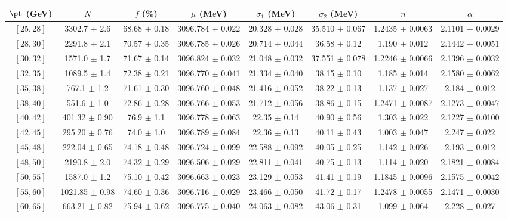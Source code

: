 \begin{tabular}{c||c|c|c|c|c|c|c}
$\pt$ (GeV) & $N$ & $f$ (\%) & $\mu$ (MeV) & $\sigma_1$ (MeV) & $\sigma_2$ (MeV) & $n$ & $\alpha$ \\
\hline
$[25, 28]$ & 3302.7 $\pm$ 2.6 & 68.68 $\pm$ 0.18 & 3096.784 $\pm$ 0.022 & 20.328 $\pm$ 0.028 & 35.510 $\pm$ 0.067 & 1.2435 $\pm$ 0.0063 & 2.1101 $\pm$ 0.0029\\
$[28, 30]$ & 2291.8 $\pm$ 2.1 & 70.57 $\pm$ 0.35 & 3096.785 $\pm$ 0.026 & 20.714 $\pm$ 0.044 & 36.58 $\pm$ 0.12 & 1.190 $\pm$ 0.012 & 2.1442 $\pm$ 0.0051\\
$[30, 32]$ & 1571.0 $\pm$ 1.7 & 71.67 $\pm$ 0.14 & 3096.824 $\pm$ 0.032 & 21.048 $\pm$ 0.032 & 37.551 $\pm$ 0.078 & 1.2246 $\pm$ 0.0066 & 2.1396 $\pm$ 0.0032\\
$[32, 35]$ & 1089.5 $\pm$ 1.4 & 72.38 $\pm$ 0.21 & 3096.770 $\pm$ 0.041 & 21.334 $\pm$ 0.040 & 38.15 $\pm$ 0.10 & 1.185 $\pm$ 0.014 & 2.1580 $\pm$ 0.0062\\
$[35, 38]$ & 767.1 $\pm$ 1.2 & 71.61 $\pm$ 0.30 & 3096.760 $\pm$ 0.048 & 21.416 $\pm$ 0.052 & 38.22 $\pm$ 0.13 & 1.137 $\pm$ 0.027 & 2.184 $\pm$ 0.012\\
$[38, 40]$ & 551.6 $\pm$ 1.0 & 72.86 $\pm$ 0.28 & 3096.766 $\pm$ 0.053 & 21.712 $\pm$ 0.056 & 38.86 $\pm$ 0.15 & 1.2471 $\pm$ 0.0087 & 2.1273 $\pm$ 0.0047\\
$[40, 42]$ & 401.32 $\pm$ 0.90 & 76.9 $\pm$ 1.1 & 3096.778 $\pm$ 0.063 & 22.35 $\pm$ 0.14 & 40.90 $\pm$ 0.56 & 1.303 $\pm$ 0.022 & 2.1227 $\pm$ 0.0100\\
$[42, 45]$ & 295.20 $\pm$ 0.76 & 74.0 $\pm$ 1.0 & 3096.789 $\pm$ 0.084 & 22.36 $\pm$ 0.13 & 40.11 $\pm$ 0.43 & 1.003 $\pm$ 0.047 & 2.247 $\pm$ 0.022\\
$[45, 48]$ & 222.04 $\pm$ 0.65 & 74.18 $\pm$ 0.48 & 3096.724 $\pm$ 0.099 & 22.588 $\pm$ 0.092 & 40.05 $\pm$ 0.25 & 1.142 $\pm$ 0.026 & 2.193 $\pm$ 0.012\\
$[48, 50]$ & 2190.8 $\pm$ 2.0 & 74.32 $\pm$ 0.29 & 3096.506 $\pm$ 0.029 & 22.811 $\pm$ 0.041 & 40.75 $\pm$ 0.13 & 1.114 $\pm$ 0.020 & 2.1821 $\pm$ 0.0084\\
$[50, 55]$ & 1587.0 $\pm$ 1.2 & 75.10 $\pm$ 0.42 & 3096.663 $\pm$ 0.023 & 23.129 $\pm$ 0.053 & 41.41 $\pm$ 0.19 & 1.1845 $\pm$ 0.0096 & 2.1575 $\pm$ 0.0042\\
$[55, 60]$ & 1021.85 $\pm$ 0.98 & 74.60 $\pm$ 0.36 & 3096.716 $\pm$ 0.029 & 23.466 $\pm$ 0.050 & 41.72 $\pm$ 0.17 & 1.2478 $\pm$ 0.0055 & 2.1471 $\pm$ 0.0030\\
$[60, 65]$ & 663.21 $\pm$ 0.82 & 75.94 $\pm$ 0.62 & 3096.775 $\pm$ 0.040 & 24.063 $\pm$ 0.082 & 43.06 $\pm$ 0.31 & 1.099 $\pm$ 0.064 & 2.228 $\pm$ 0.027\\

\end{tabular}
